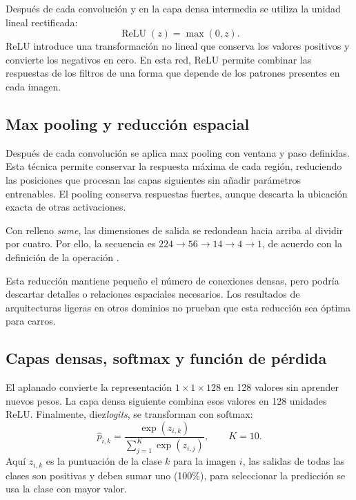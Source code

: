 \documentclass[conference]{IEEEtran}
\begin{document}
Después de cada convolución y en la capa densa intermedia se utiliza la unidad lineal rectificada:
\begin{equation}
\operatorname{ReLU}(z)=\max(0,z).
\label{eq:relu}
\end{equation}
ReLU introduce una transformación no lineal que conserva los valores positivos y convierte los negativos en cero. En esta red, ReLU permite combinar las respuestas de los filtros de una forma que depende de los patrones presentes en cada imagen.

\subsection{Max pooling y reducción espacial}

Después de cada convolución se aplica max pooling con ventana y paso definidas. Esta técnica permite conservar la respuesta máxima de cada región, reduciendo las posiciones que procesan las capas siguientes sin añadir parámetros entrenables. El pooling conserva respuestas fuertes, aunque descarta la ubicación exacta de otras activaciones.

Con relleno \textit{same}, las dimensiones de salida se redondean hacia arriba al dividir por cuatro. Por ello, la secuencia es $224\rightarrow56\rightarrow14\rightarrow4\rightarrow1$, de acuerdo con la definición de la operación \citep{kerasPooling}. 

Esta reducción mantiene pequeño el número de conexiones densas, pero podría descartar detalles o relaciones espaciales necesarios. Los resultados de arquitecturas ligeras en otros dominios \citep{appasami2025} no prueban que esta reducción sea óptima para carros. 

\subsection{Capas densas, softmax y función de pérdida}

El aplanado convierte la representación $1\times1\times128$ en 128 valores sin aprender nuevos pesos. La capa densa siguiente combina esos valores en 128 unidades ReLU. Finalmente, diez\textit{logits}, se transforman con softmax:
\begin{equation}
\widehat{p}_{i,k}=\frac{\exp(z_{i,k})}{\sum_{j=1}^{K}\exp(z_{i,j})},
\qquad K=10.
\label{eq:softmax}
\end{equation}
Aquí $z_{i,k}$ es la puntuación de la clase $k$ para la imagen $i$, las salidas de todas las clases son positivas y deben sumar uno (100\%), para seleccionar la predicción se usa la clase con mayor valor. 
\end{document}
